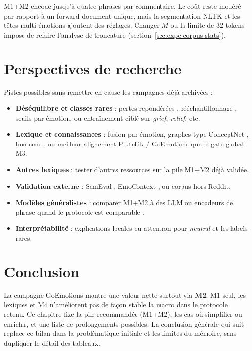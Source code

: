 M1+M2 encode jusqu'à quatre phrases par
commentaire. Le coût reste modéré par rapport à un forward document
unique, mais la segmentation NLTK et les têtes multi-émotions ajoutent
des réglages. Changer $M$ ou la limite de 32 tokens impose de refaire
l'analyse de troncature (section~\ref{sec:expe-corpus-stats}).

\section{Perspectives de recherche}
\label{sec:persp-recherche}

Pistes possibles sans remettre en cause les campagnes déjà archivées :
\begin{itemize}
\item \textbf{Déséquilibre et classes rares} : pertes repondérées
      \cite{lin2017focal}, rééchantillonnage \cite{chawla2002smote},
      seuils par émotion, ou entraînement ciblé sur \emph{grief},
      \emph{relief}, etc.
\item \textbf{Lexique et connaissances} : fusion par émotion, graphes
      type ConceptNet \cite{speer2017}, bon sens \cite{ghosal2020cosmic},
      ou meilleur alignement Plutchik / GoEmotions que le gate global M3.
\item \textbf{Autres lexiques} : tester d'autres ressources sur la pile
      M1+M2 déjà validée.
\item \textbf{Validation externe} : SemEval \cite{mohammad2018semeval},
      EmoContext \cite{semeval2019emocontext}, ou corpus hors Reddit.
\item \textbf{Modèles généralistes} : comparer M1+M2 à des LLM ou
      encodeurs de phrase \cite{reimers2019sentence} quand le protocole
      est comparable \cite{sharma2024deeplearningmlc}.
\item \textbf{Interprétabilité} : explications locales ou attention
      \cite{ribeiro2016lime,clark2019bert} pour \emph{neutral} et les
      labels rares.
\end{itemize}

\section*{Conclusion}
La campagne GoEmotions montre une valeur nette surtout via \textbf{M2}.
M1 seul, les lexiques et M4 n'améliorent pas de façon stable la macro
dans le protocole retenu. Ce chapitre fixe la pile recommandée (M1+M2),
les cas où simplifier ou enrichir, et une liste de prolongements possibles.
La conclusion générale qui suit replace ce bilan dans la problématique
initiale et les limites du mémoire, sans dupliquer le détail des tableaux.
